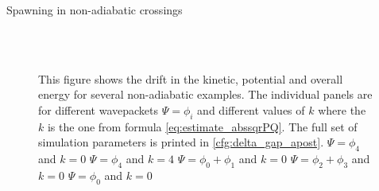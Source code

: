 \begin{chapter}{Spawning in non-adiabatic crossings}
\begin{figure}[h!]
{  } \\
   \\
  \caption[The drift in the kinetic, potential and overall energy for several non-adiabatic examples]{
  This figure shows the drift in the kinetic, potential and overall energy for
  several non-adiabatic examples. The individual panels are for different wavepackets $\Psi = \phi_i$
  and different values of $k$ where the $k$ is the one from formula \eqref{eq:estimate_abssqrPQ}.
  The full set of simulation parameters is printed in \ref{cfg:delta_gap_apost}.
   $\Psi = \phi_4$ and $k=0$
   $\Psi = \phi_4$ and $k=4$
   $\Psi = \phi_0 + \phi_1$ and $k=0$
   $\Psi = \phi_2 + \phi_3$ and $k=0$
   $\Psi = \phi_0$ and $k=0$
  \label{fig:spawn_delta_gap_energy_drift2}
  }
\end{figure}




\end{chapter}
